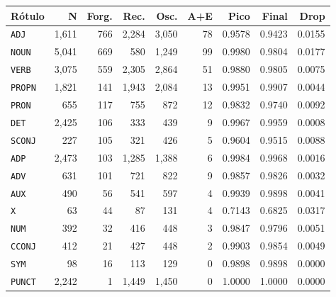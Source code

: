 \begin{table}[ht]
\hfill
\begin{minipage}[t]{0.42\linewidth}
\centering\tiny
\begin{tabular}{lrrrrrrrr}
\toprule
\textbf{Rótulo} & \textbf{N} & \textbf{Forg.} & \textbf{Rec.} & \textbf{Osc.} & \textbf{A+E} & \textbf{Pico} & \textbf{Final} & \textbf{Drop} \\
\midrule
\texttt{ADJ} & 1,611 & 766 & 2,284 & 3,050 & 78 & 0.9578 & 0.9423 & 0.0155 \\
\texttt{NOUN} & 5,041 & 669 & 580 & 1,249 & 99 & 0.9980 & 0.9804 & 0.0177 \\
\texttt{VERB} & 3,075 & 559 & 2,305 & 2,864 & 51 & 0.9880 & 0.9805 & 0.0075 \\
\texttt{PROPN} & 1,821 & 141 & 1,943 & 2,084 & 13 & 0.9951 & 0.9907 & 0.0044 \\
\texttt{PRON} & 655 & 117 & 755 & 872 & 12 & 0.9832 & 0.9740 & 0.0092 \\
\texttt{DET} & 2,425 & 106 & 333 & 439 & 9 & 0.9967 & 0.9959 & 0.0008 \\
\texttt{SCONJ} & 227 & 105 & 321 & 426 & 5 & 0.9604 & 0.9515 & 0.0088 \\
\texttt{ADP} & 2,473 & 103 & 1,285 & 1,388 & 6 & 0.9984 & 0.9968 & 0.0016 \\
\texttt{ADV} & 631 & 101 & 721 & 822 & 9 & 0.9857 & 0.9826 & 0.0032 \\
\texttt{AUX} & 490 & 56 & 541 & 597 & 4 & 0.9939 & 0.9898 & 0.0041 \\
\texttt{X} & 63 & 44 & 87 & 131 & 4 & 0.7143 & 0.6825 & 0.0317 \\
\texttt{NUM} & 392 & 32 & 416 & 448 & 3 & 0.9847 & 0.9796 & 0.0051 \\
\texttt{CCONJ} & 412 & 21 & 427 & 448 & 2 & 0.9903 & 0.9854 & 0.0049 \\
\texttt{SYM} & 98 & 16 & 113 & 129 & 0 & 0.9898 & 0.9898 & 0.0000 \\
\texttt{PUNCT} & 2,242 & 1 & 1,449 & 1,450 & 0 & 1.0000 & 1.0000 & 0.0000 \\
\bottomrule
\end{tabular}
\end{minipage}
\end{table}


